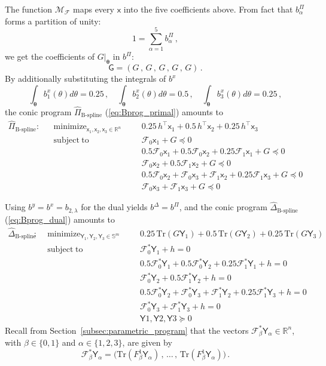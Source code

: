 \documentclass{article}
\DeclareMathOperator*{\minimize}{minimize}
\DeclareMathOperator*{\subj}{subject\;to}
\newcommand{\R}{\mathbb{R}}         %
\renewcommand{\S}{\mathbb{S}}       %
\newcommand{\Tr}{\mathrm{Tr}}       %
\renewcommand{\t}{\intercal}        %
\newcommand{\adj}{\ast}                     %
\newcommand{\ppar}{\theta}                          %
\newcommand{\Ppar}{{\bm{\theta}}}                   %
\newcommand{\calF}{\mathcal{F}}                     %
\newcommand{\bx}{b^x}               %
\newcommand{\cx}{\textsf{x}}        %
\newcommand{\by}{b^y}               %
\newcommand{\bPi}{b^\Pi}                %
\newcommand{\bPia}{b^\Pi_\alpha}        %
\newcommand{\bDelta}{b^\Delta}          %
\newcommand{\calMF}{\mathcal{M}_{\mathcal{F}}}              %
\newcommand{\cG}{\textsf{G}}            %
\newcommand{\cY}{\textsf{Y}}            %
\newcommand{\cYa}{\textsf{Y}_\alpha}    %
\begin{document}
The function $\calMF$ maps every $\cx$ into the five coefficients above. From fact that $\bPia$ forms a partition of unity:
\[ 1 = \sum_{\alpha=1}^5 \bPia \,,
\]
we get the coefficients of $G|_\Ppar$ in $\bPi$:
\[ \cG = (G \,,\, G \,,\, G \,,\, G \,,\, G) \,.%
\]
By additionally substituting the integrals of $\bx$
\[ \int_\Ppar \bx_1(\ppar)d\ppar = 0.25\,,\quad \int_\Ppar \bx_2(\ppar)d\ppar = 0.5 \,,\quad \int_\Ppar \bx_3(\ppar)d\ppar = 0.25 \,,%
\]
the conic program $\hat{\Pi}_{\text{B-spline}}$ (\ref{eq:Bprog_primal}) amounts to
\[\begin{aligned}
\hat{\Pi}_{\text{B-spline}}: && \minimize_{\cx_1,\cx_2,\cx_3\in\R^n} &&&  0.25\,h^\t\cx_1 + 0.5\,h^\t\cx_2 + 0.25\,h^\t\cx_3  \\%
                             && \subj                               &&& \calF_0\cx_1 + G \preceq 0 \\%
                             &&                                     &&& 0.5\calF_0\cx_1 + 0.5\calF_0\cx_2 + 0.25 \calF_1\cx_1 + G \preceq 0 \\%
                             &&                                     &&& \calF_0\cx_2+0.5\calF_1\cx_2 + G \preceq 0 \\%
                             &&                                     &&& 0.5\calF_0\cx_2+\calF_0\cx_3+\calF_1\cx_2+0.25\calF_1\cx_3 + G \preceq 0 \\%
                             &&                                     &&& \calF_0\cx_3 +\calF_1\cx_3 + G \preceq 0 %
\end{aligned}\]

Using $\by = \bx = b_{2,\lambda}$ for the dual yields $\bDelta=\bPi$, and the conic program $\hat{\Delta}_{\text{B-spline}}$ (\ref{eq:Bprog_dual}) amounts to
\[\begin{aligned}
\hat{\Delta}_{\text{B-spline}}: && \minimize_{\cY_1,\cY_2,\cY_3\in\S^m} &&&  0.25\,\Tr(G\cY_1) + 0.5\,\Tr(G\cY_2) + 0.25\,\Tr(G\cY_3)  \\%
                                && \subj                                &&& \calF^\adj_0\cY_1 + h = 0 \\%
                                &&                                      &&& 0.5\calF^\adj_0\cY_1 + 0.5\calF^\adj_0\cY_2 + 0.25 \calF^\adj_1\cY_1 + h = 0 \\%
                                &&                                      &&& \calF^\adj_0\cY_2+0.5\calF^\adj_1\cY_2 + h = 0 \\%
                                &&                                      &&& 0.5\calF^\adj_0\cY_2+\calF^\adj_0\cY_3+\calF^\adj_1\cY_2+0.25\calF^\adj_1\cY_3 + h = 0 \\%
                                &&                                      &&& \calF^\adj_0\cY_3 +\calF^\adj_1\cY_3 + h = 0 \\%
                                &&                                      &&& \cY1, \cY2, \cY3 \succeq 0 %
\end{aligned}\]
Recall from Section~\ref{subsec:parametric_program} that the vectors $\calF^\adj_\beta \cYa \in \R^n$, with $\beta\in\{0,1\}$ and $\alpha\in\{1,2,3\}$, are given by
\[ \calF^\adj_\beta \cYa = \big(\Tr(F_\beta^1\cYa) \,,\, \ldots \,,\, \Tr(F_\beta^1\cYa) \big)\,.%
\]
\end{document}
